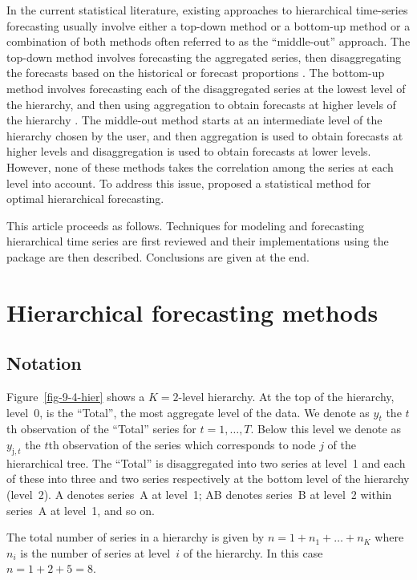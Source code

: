 \documentclass[nojss]{jss}
\def\pred#1#2#3{#1_{\text{#2},#3}}
\def\y#1#2{\pred{y}{#1}{#2}}
\begin{document}
In the current statistical literature, existing approaches to hierarchical time-series forecasting usually involve either a top-down method or a bottom-up method or a combination of both methods often referred to as the ``middle-out'' approach. The top-down method involves forecasting the aggregated series, then disaggregating the forecasts based on the historical or forecast proportions \citep[see][for possible ways of choosing these proportions]{GS90,GAH09}. The bottom-up method involves forecasting each of the disaggregated series at the lowest level of the hierarchy, and then using aggregation to obtain forecasts at higher levels of the hierarchy \citep{Kahn98}. The middle-out method starts at an intermediate level of the hierarchy chosen by the user, and then aggregation is used to obtain forecasts at higher levels and disaggregation is used to obtain forecasts at lower levels. However, none of these methods takes the correlation among the series at each level into account. To address this issue, \cite{HAA+11} proposed a statistical method for optimal hierarchical forecasting.

This article proceeds as follows. Techniques for modeling and forecasting hierarchical time series are first reviewed and their implementations using the  package are then described. Conclusions are given at the end.

\section*{Hierarchical forecasting methods}\label{sec:2}

\subsection*{Notation}

Figure~\ref{fig-9-4-hier} shows a $K=2$-level hierarchy. At the top of the hierarchy, level~0, is the ``Total'', the most aggregate level of the data. We denote as $y_t$ the $t$th observation of the ``Total'' series for $t=1,\dots,T$. Below this level we denote as $\y{j}{t}$ the $t$th observation of the series which corresponds to node $j$ of the hierarchical tree. The ``Total'' is disaggregated into two series at level~1 and each of these into three and two series respectively at the bottom level of the hierarchy (level~2). A denotes series~A at level~1; AB denotes series~B at level~2 within series~A at level~1, and so on.

The total number of series in a hierarchy is given by $n=1+n_1+\dots+n_K$ where $n_i$ is the number of series at level~$i$ of the hierarchy. In this case $n=1+2+5=8$.
\end{document}
